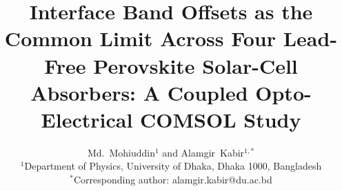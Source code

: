 \documentclass[lettersize,journal]{IEEEtran}
\begin{document}
\title{Interface Band Offsets as the Common Limit Across Four Lead-Free
Perovskite Solar-Cell Absorbers: A Coupled Opto-Electrical COMSOL Study}

\author{Md.~Mohiuddin$^{1}$ and Alamgir~Kabir$^{1,\ast}$\\[4pt]
\normalsize $^{1}$Department of Physics, University of Dhaka, Dhaka 1000, Bangladesh\\
\normalsize $^{\ast}$Corresponding author: alamgir.kabir@du.ac.bd}

\markboth{}{}

\maketitle
\end{document}
